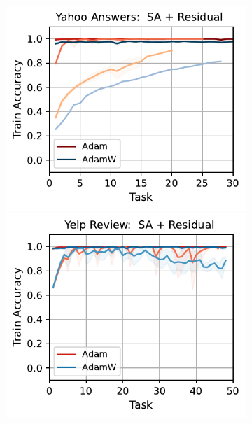 \begin{figure}[htb!]
{\begin{figure}[t]
{        \includegraphics[width=\textwidth]{figs/Accuracy/nlp/attention_residual/yahoo_answers_40.pdf}
        \includegraphics[width=\textwidth]{figs/Accuracy/nlp/attention_residual/yelp_review_full_40.pdf}
    }
    \\
    \resizebox{\textwidth}{!}{
}
\end{figure}}
\end{figure}
